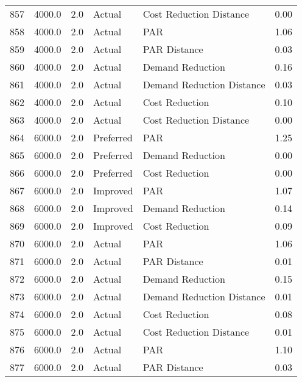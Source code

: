 \begin{longtable}{lrrllr}
857  &       4000.0 &     2.0 &         Actual &    Cost Reduction Distance &   0.00 \\
858  &       4000.0 &     2.0 &         Actual &                        PAR &   1.06 \\
859  &       4000.0 &     2.0 &         Actual &               PAR Distance &   0.03 \\
860  &       4000.0 &     2.0 &         Actual &           Demand Reduction &   0.16 \\
861  &       4000.0 &     2.0 &         Actual &  Demand Reduction Distance &   0.03 \\
862  &       4000.0 &     2.0 &         Actual &             Cost Reduction &   0.10 \\
863  &       4000.0 &     2.0 &         Actual &    Cost Reduction Distance &   0.00 \\
864  &       6000.0 &     2.0 &      Preferred &                        PAR &   1.25 \\
865  &       6000.0 &     2.0 &      Preferred &           Demand Reduction &   0.00 \\
866  &       6000.0 &     2.0 &      Preferred &             Cost Reduction &   0.00 \\
867  &       6000.0 &     2.0 &       Improved &                        PAR &   1.07 \\
868  &       6000.0 &     2.0 &       Improved &           Demand Reduction &   0.14 \\
869  &       6000.0 &     2.0 &       Improved &             Cost Reduction &   0.09 \\
870  &       6000.0 &     2.0 &         Actual &                        PAR &   1.06 \\
871  &       6000.0 &     2.0 &         Actual &               PAR Distance &   0.01 \\
872  &       6000.0 &     2.0 &         Actual &           Demand Reduction &   0.15 \\
873  &       6000.0 &     2.0 &         Actual &  Demand Reduction Distance &   0.01 \\
874  &       6000.0 &     2.0 &         Actual &             Cost Reduction &   0.08 \\
875  &       6000.0 &     2.0 &         Actual &    Cost Reduction Distance &   0.01 \\
876  &       6000.0 &     2.0 &         Actual &                        PAR &   1.10 \\
877  &       6000.0 &     2.0 &         Actual &               PAR Distance &   0.03 \\

\end{longtable}
